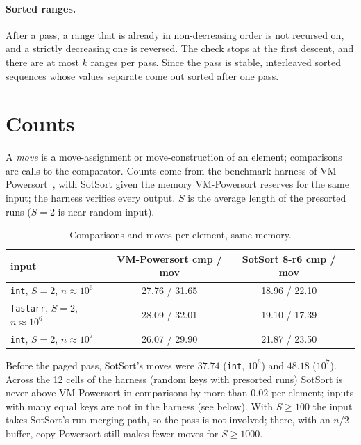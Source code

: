 \documentclass[11pt]{article}
\theoremstyle{remark}
\begin{document}
\paragraph{Sorted ranges.} After a pass, a range that is already in non-decreasing order is not
recursed on, and a strictly decreasing one is reversed. The check stops at the first descent,
and there are at most $k$ ranges per pass. Since the pass is stable, interleaved sorted
sequences whose values separate come out sorted after one pass.

\section{Counts}

A \emph{move} is a move-assignment or move-construction of an element;
comparisons are calls to the comparator. Counts come from the benchmark
harness of VM-Powersort~\cite{vmps}, with SotSort given the memory VM-Powersort reserves for the
same input; the harness verifies every output. $S$ is the average length of the presorted runs ($S=2$ is near-random input).

\begin{table}[h]
\centering
\begin{tabular}{lccc}
\toprule
input & VM-Powersort cmp / mov & SotSort 8-r6 cmp / mov \\
\midrule
\texttt{int}, $S=2$, $n\approx10^6$     & 27.76 / 31.65 & 18.96 / 22.10 \\
\texttt{fastarr}, $S=2$, $n\approx10^6$ & 28.09 / 32.01 & 19.10 / 17.39 \\
\texttt{int}, $S=2$, $n\approx10^7$     & 26.07 / 29.90 & 21.87 / 23.50 \\
\bottomrule
\end{tabular}
\caption{Comparisons and moves per element, same memory.}
\end{table}

Before the paged pass, SotSort's moves were $37.74$ (\texttt{int}, $10^6$) and $48.18$
($10^7$). Across the 12 cells of the harness (random keys with presorted runs) SotSort is never above
VM-Powersort in comparisons by more than $0.02$ per element; inputs with many equal keys are
not in the harness (see below). With $S\ge100$ the input takes SotSort's
run-merging path, so the pass is not involved; there, with an $n/2$ buffer,
copy-Powersort still makes fewer moves for $S\ge1000$.
\end{document}
